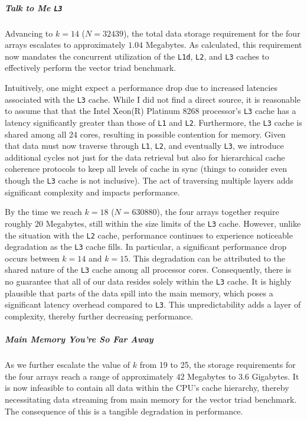 \documentclass{article}
\begin{document}
\subparagraph*{Talk to Me \texttt{L3}} Advancing to \( k = 14 \) (\( N = 32439 \)), the total data storage requirement for the four arrays escalates to approximately \( 1.04 \) Megabytes. As calculated, this requirement now mandates the concurrent utilization of the \texttt{L1d}, \texttt{L2}, and \texttt{L3} caches to effectively perform the vector triad benchmark.

Intuitively, one might expect a performance drop due to increased latencies associated with the \texttt{L3} cache. While I did not find a direct source, it is reasonable to assume that that the Intel Xeon(R) Platinum 8268 processor's \texttt{L3} cache has a latency significantly greater than those of \texttt{L1} and \texttt{L2}. Furthermore, the \texttt{L3} cache is shared among all 24 cores, resulting in possible contention for memory. 
Given that data must now traverse through \texttt{L1}, \texttt{L2}, and eventually \texttt{L3}, we introduce additional cycles not just for the data retrieval but also for hierarchical cache coherence protocols to keep all levels of cache in sync (things to consider even though the \texttt{L3} cache is not inclusive). The act of traversing multiple layers adds significant complexity and impacts performance.

By the time we reach \( k = 18 \) (\( N = 630880 \)), the four arrays together require roughly \( 20 \) Megabytes, still within the size limits of the \texttt{L3} cache. However, unlike the situation with the \texttt{L2} cache, performance continues to experience noticeable degradation as the \texttt{L3} cache fills. In particular, a significant performance drop occurs between \( k = 14 \) and \( k = 15 \). This degradation can be attributed to the shared nature of the \texttt{L3} cache among all processor cores. Consequently, there is no guarantee that all of our data resides solely within the \texttt{L3} cache. It is highly plausible that parts of the data spill into the main memory, which poses a significant latency overhead compared to \texttt{L3}. This unpredictability adds a layer of complexity, thereby further decreasing performance.

\subparagraph*{Main Memory You're So Far Away} 
As we further escalate the value of \( k \) from 19 to 25, the storage requirements for the four arrays reach a range of approximately \( 42 \) Megabytes to \( 3.6 \) Gigabytes.
It is now infeasible to contain all data within the CPU's cache hierarchy, thereby necessitating data streaming from main memory for the vector triad benchmark. The consequence of this is a tangible degradation in performance. 
\end{document}
